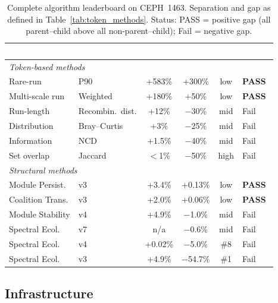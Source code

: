 \documentclass{../yalumba}
\begin{document}
\begin{table}[H]
  \centering
  \tablestyle
  \caption{Complete algorithm leaderboard on CEPH~1463.  Separation and
    gap as defined in Table~\ref{tab:token_methods}.  Status: PASS =
    positive gap (all parent--child above all non-parent--child);
    Fail = negative gap.}
  \label{tab:leaderboard}
  \begin{tabular}{llcccl}
    \toprule
    \rowcolor{table-header}
    \textcolor{white}{\textbf{Family}} &
    \textcolor{white}{\textbf{Best variant}} &
    \textcolor{white}{\textbf{Sep}} &
    \textcolor{white}{\textbf{Gap}} &
    \textcolor{white}{\textbf{Sp.}} &
    \textcolor{white}{\textbf{Status}} \\
    \midrule
    \multicolumn{6}{l}{\textit{Token-based methods}} \\
    Rare-run & P90 & +583\% & +300\% & low & \textbf{PASS} \\
    Multi-scale run & Weighted & +180\% & +50\% & low & \textbf{PASS} \\
    Run-length & Recombin.\ dist. & +12\% & $-$30\% & mid & Fail \\
    Distribution & Bray--Curtis & +3\% & $-$25\% & mid & Fail \\
    Information & NCD & +1.5\% & $-$40\% & mid & Fail \\
    Set overlap & Jaccard & $<$1\% & $-$50\% & high & Fail \\
    \midrule
    \multicolumn{6}{l}{\textit{Structural methods}} \\
    Module Persist. & v3 & +3.4\% & +0.13\% & low & \textbf{PASS} \\
    Coalition Trans. & v3 & +2.0\% & +0.06\% & low & \textbf{PASS} \\
    Module Stability & v4 & +4.9\% & $-$1.0\% & mid & Fail \\
    Spectral Ecol. & v7 & n/a & $-$0.6\% & mid & Fail \\
    Spectral Ecol. & v4 & +0.02\% & $-$5.0\% & \#8 & Fail \\
    Spectral Ecol. & v3 & +4.9\% & $-$54.7\% & \#1 & Fail \\
    \bottomrule
  \end{tabular}
\end{table}

\subsection{Infrastructure}
\label{sec:status:infrastructure}
\end{document}

